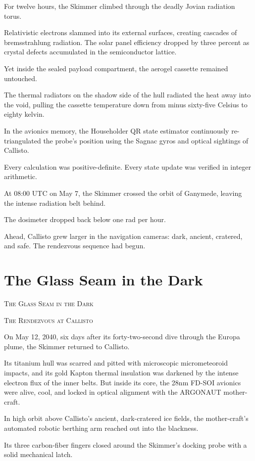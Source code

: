 \documentclass[12pt,twoside,openright]{book}
\newcommand{\sceneheader}[1]{%
  \par\vspace{1.8em}%
  {\noindent\centering\scshape\large #1\par}%
  \vspace{1.0em}%
  \noindent%
}
\begin{document}
For twelve hours, the Skimmer climbed through the deadly Jovian
radiation torus.

Relativistic electrons slammed into its external surfaces, creating
cascades of bremsstrahlung radiation. The solar panel efficiency dropped
by three percent as crystal defects accumulated in the semiconductor
lattice.

Yet inside the sealed payload compartment, the aerogel cassette remained
untouched.

The thermal radiators on the shadow side of the hull radiated the heat
away into the void, pulling the cassette temperature down from minus
sixty-five Celsius to eighty kelvin.

In the avionics memory, the Householder QR state estimator continuously
re-triangulated the probe's position using the Sagnac gyros and optical
sightings of Callisto.

Every calculation was positive-definite. Every state update was verified
in integer arithmetic.

At 08:00 UTC on May 7, the Skimmer crossed the orbit of Ganymede,
leaving the intense radiation belt behind.

The dosimeter dropped back below one rad per hour.

Ahead, Callisto grew larger in the navigation cameras: dark, ancient,
cratered, and safe. The rendezvous sequence had begun.

\chapter{The Glass Seam in the Dark}
\sceneheader{The Glass Seam in the
Dark}

\sceneheader{The Rendezvous at
Callisto}

On May 12, 2040, six days after its forty-two-second dive through the
Europa plume, the Skimmer returned to Callisto.

Its titanium hull was scarred and pitted with microscopic micrometeoroid
impacts, and its gold Kapton thermal insulation was darkened by the
intense electron flux of the inner belts. But inside its core, the 28nm
FD-SOI avionics were alive, cool, and locked in optical alignment with
the ARGONAUT mother-craft.

In high orbit above Callisto's ancient, dark-cratered ice fields, the
mother-craft's automated robotic berthing arm reached out into the
blackness.

Its three carbon-fiber fingers closed around the Skimmer's docking probe
with a solid mechanical latch.
\end{document}
